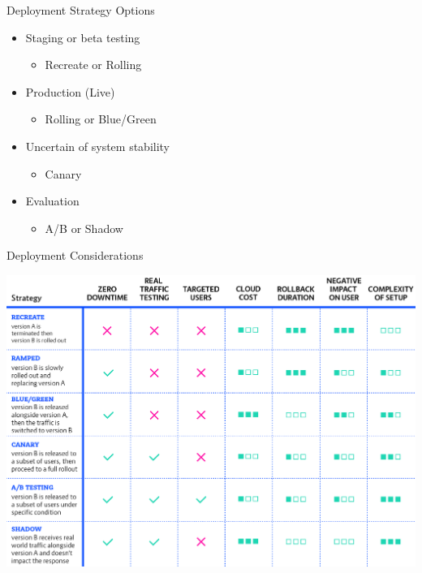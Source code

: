 \documentclass{slide}
\begin{document}
\begin{frame}{Deployment Strategy Options}
  \vspace{1pt}
  {\huge
    \begin{itemize}
        \item Staging or beta testing
        \begin{itemize}
            \LARGE\item Recreate or Rolling
        \end{itemize}
        \vspace{1mm}
        \item Production (Live)
        \begin{itemize}
            \LARGE\item Rolling or Blue/Green
        \end{itemize}
        \vspace{1mm}
        \item Uncertain of system stability
        \begin{itemize}
            \LARGE\item Canary
        \end{itemize}
        \vspace{1mm}
        \item Evaluation
        \begin{itemize}
            \LARGE\item A/B or Shadow
        \end{itemize}
    \end{itemize}
  }
\end{frame}

\begin{frame}{Deployment Considerations \cite{deployment-strategies}}
    \begin{adjustwidth}{-12mm}{-12mm}
        \centering
        \includegraphics[height=0.93\textheight]{diagrams/deployment_strategies.png}
    \end{adjustwidth}
\end{frame}
\end{document}

